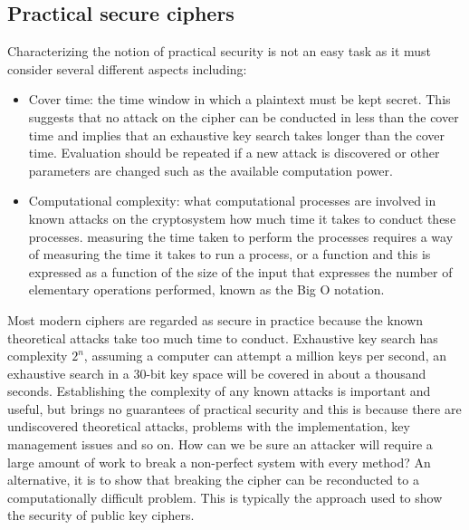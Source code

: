 	\subsection{Practical secure ciphers}
	Characterizing the notion of practical security is not an easy task as it must consider several different aspects including:
	\begin{itemize}
		\item Cover time: the time window in which a plaintext must be kept secret. This suggests that no attack on the cipher can be conducted in less than the cover time and implies that an exhaustive key search takes longer than the cover time. Evaluation should be repeated if a new attack is discovered or other parameters are changed such as the available computation power.
		\item Computational complexity: what computational processes are involved in known attacks on the cryptosystem how much time it takes to conduct these processes. measuring the time taken to perform the processes requires a way of measuring the time it takes to run a process, or a function and this is expressed as a function of the size of the input that expresses the number of elementary operations performed, known as the Big O notation.
	\end{itemize}
	Most modern ciphers are regarded as secure in practice because the known theoretical attacks take too much time to conduct.
	Exhaustive key search has complexity $2^{n}$, assuming a computer can attempt a million keys per second, an exhaustive search in a 30-bit key space will be covered in about a thousand seconds.
	Establishing the complexity of any known attacks is important and useful, but brings no guarantees of practical security and this is because there are undiscovered theoretical attacks, problems with the implementation, key management issues and so on.
	How can we be sure an attacker will require a large amount of work to break a non-perfect system with every method? An alternative, it is to show that breaking the cipher can be reconducted to a computationally difficult problem. This is typically the approach used to show the security of public key ciphers.